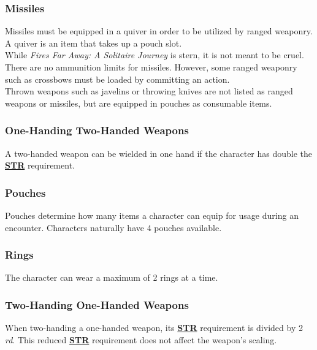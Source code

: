 \documentclass[12pt]{article}
\newcommand{\refto}[1]{\hyperlink{#1}{\textbf{#1}}}
\begin{document}
\begin{multicols*}{2}
\subsubsection{Missiles}
Missiles must be equipped in a quiver in order to be utilized by ranged weaponry. A quiver is an item that takes up a pouch slot.\\
While \emph{Fires Far Away: A Solitaire Journey} is stern, it is not meant to be cruel. There are no ammunition limits for missiles. However, some ranged weaponry such as crossbows must be loaded by committing an action.\\
Thrown weapons such as javelins or throwing knives are not listed as ranged weapons or missiles, but are equipped in pouches as consumable items.

\subsubsection{One-Handing Two-Handed Weapons}
A two-handed weapon can be wielded in one hand if the character has double the \refto{STR} requirement.

\subsubsection{Pouches}
Pouches determine how many items a character can equip for usage during an encounter. Characters naturally have 4 pouches available.

\subsubsection{Rings}
The character can wear a maximum of 2 rings at a time.

\subsubsection{Two-Handing One-Handed Weapons}
When two-handing a one-handed weapon, its \refto{STR} requirement is divided by 2 \emph{rd}. This reduced \refto{STR} requirement does not affect the weapon’s scaling.


\end{multicols*}
\end{document}
